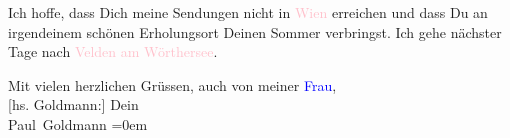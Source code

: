\pstart
           Ich hoffe, dass Dich meine Sendungen nicht in \textcolor{pink}{Wien}{}\ledrightnote{\textcolor{pink}{Wien}}
               erreichen und dass Du an irgendeinem schönen Erholungsort Deinen Sommer verbringst.
               Ich gehe nächster Tage nach \textcolor{pink}{Velden am
               Wörthersee}{}\ledrightnote{\textcolor{pink}{Velden am Wörthersee}}.\pend
           
\pstart
           Mit vielen herzlichen Grüssen, auch von meiner \textcolor{blue}{Frau}{}\ledrightnote{{$\rightarrow$}\textcolor{blue}{Eva Marie Goldmann}}, {\\[\baselineskip]}{[}hs. Goldmann:{]} Dein {\\[\baselineskip]}\spacefill\mbox{Paul Goldmann}\pend
           \leftskip=0em{}\endnumbering{}
\begin{anhang}
\end{anhang}
      